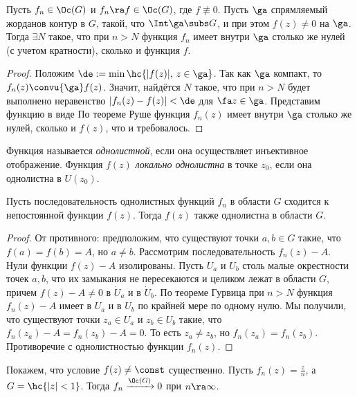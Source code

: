 \documentclass[a4paper]{article}
\begin{document}
\begin{theorem}
\begin{theorem}
Пусть $f_n \in\Oc(G)$ и $f_n \ra f \in \Oc(G)$, где $f\not \equiv 0$.
Пусть $\ga$ спрямляемый жорданов контур в $G$, такой, что $\Int \ga \subs G$, и
при этом $f(z) \neq 0$ на $\ga$. Тогда $\exi N$ такое, что при $n > N$ функция $f_n$ имеет внутри $\ga$ столько
же нулей (с учетом кратности), сколько и функция $f$.
\end{theorem}
\begin{proof}
Положим $\de := \min \hc{|f(z)|,\, z \in \ga}$.
Так как $\ga$ компакт, то $f_n(z) \convu{\ga} f(z)$. Значит, найдётся $N$ такое, что при $n > N$
будет выполнено неравенство $|f_n(z)-f(z)|<\de$ для $\fa z \in \ga$.
Представим функцию в виде
По теореме Руше функция $f_n(z)$  имеет внутри $\ga$  столько же нулей, сколько и $f(z)$,  что и требовалось.
\end{proof}

\begin{df}
Функция называется \emph{однолистной}, если она осуществляет инъективное отображение.
Функция $f(z)$ \emph{локально однолистна} в точке $z_0$, если она однолистна в $U(z_0)$.
\end{df}

\begin{theorem}
Пусть последовательность однолистных функций $f_n$ в области $G$ сходится к непостоянной функции $f(z)$.
Тогда $f(z)$ также однолистна в области $G$.
\end{theorem}
\begin{proof}
От противного: предположим, что существуют точки $a, b\in G$ такие, что $f(a)=f(b)=A$, но $a\neq b$.
Рассмотрим последовательность $f_n(z) - A$.
Нули функции $f(z)-A$ изолированы. Пусть $U_a$ и $U_b$ столь малые окрестности точек $a,b$, что их
замыкания не пересекаются и целиком лежат в области $G$, причем $f(z)-A\neq 0$ в $\dot U_a$ и в $\dot U_b$.
По теореме Гурвица при $n>N$ функция $f_n(z)-A$ имеет в $U_a$ и в $U_b$ по крайней мере по одному нулю.
Мы получили, что существуют точки $z_a \in U_a$ и $z_b \in U_b$ такие, что $f_n(z_a)-A=f_n(z_b)-A=0$. То есть
$z_a \neq z_b$, но $f_n(z_a)=f_n(z_b)$. Противоречие с однолистностью функции $f_n(z)$.
\end{proof}

\begin{ex}
Покажем, что условие $f(z)\neq\const$ существенно.
Пусть $f_n(z)=\frac{z}{n}$, а $G = \hc{|z| < 1}$. Тогда $f_n \xrightarrow{\Oc(G)} 0$ при $n\ra \infty$.
\end{ex}


\end{theorem}
\end{document}
